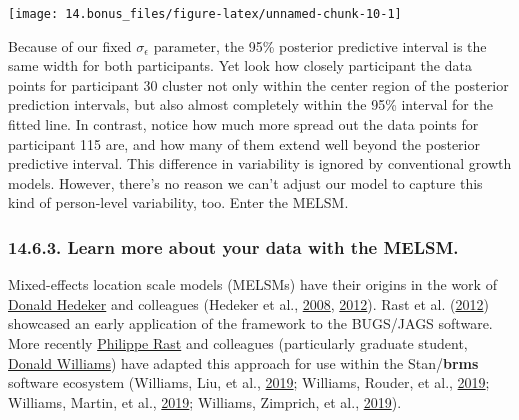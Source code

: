 \documentclass[]{article}
\begin{document}
\begin{center}\texttt{[image: 14.bonus\_files/figure-latex/unnamed-chunk-10-1]} \end{center}

Because of our fixed \(\sigma_\epsilon\) parameter, the 95\% posterior
predictive interval is the same width for both participants. Yet look
how closely participant the data points for participant 30 cluster not
only within the center region of the posterior prediction intervals, but
also almost completely within the 95\% interval for the fitted line. In
contrast, notice how much more spread out the data points for
participant 115 are, and how many of them extend well beyond the
posterior predictive interval. This difference in variability is ignored
by conventional growth models. However, there's no reason we can't
adjust our model to capture this kind of person-level variability, too.
Enter the MELSM.

\hypertarget{learn-more-about-your-data-with-the-melsm.}{%
\subsubsection{14.6.3. Learn more about your data with the
MELSM.}\label{learn-more-about-your-data-with-the-melsm.}}

Mixed-effects location scale models (MELSMs) have their origins in the
work of
\href{https://health.uchicago.edu/faculty/donald-hedeker-phd}{Donald
Hedeker} and colleagues (Hedeker et al.,
\protect\hyperlink{ref-hedekerApplicationMixedeffectsLocation2008}{2008},
\protect\hyperlink{ref-hedekerModelingWithinsubjectVariance2012}{2012}).
Rast et al.
(\protect\hyperlink{ref-rastModelingIndividualDifferences2012}{2012})
showcased an early application of the framework to the BUGS/JAGS
software. More recently \href{https://twitter.com/rastlab}{Philippe
Rast} and colleagues (particularly graduate student,
\href{wdonald_1985}{Donald Williams}) have adapted this approach for use
within the Stan/\textbf{brms} software ecosystem (Williams, Liu, et al.,
\protect\hyperlink{ref-williamsBayesianMultivariateMixedeffects2019a}{2019};
Williams, Rouder, et al.,
\protect\hyperlink{ref-williamsSurfaceUnearthingWithinperson2019}{2019};
Williams, Martin, et al.,
\protect\hyperlink{ref-williamsPuttingIndividualReliability2019}{2019};
Williams, Zimprich, et al.,
\protect\hyperlink{ref-williamsBayesianNonlinearMixedeffects2019a}{2019}).
\end{document}
